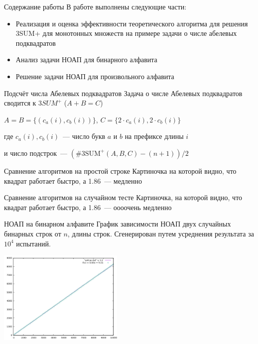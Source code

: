 \documentclass[hyperref=unicode,graphics=pdflatex,12pt]{beamer}
\begin{document}
\begin{frame}{Содержание работы}
\hspace{0.5cm}
В работе выполнены следующие части:
\begin{itemize}
\item<1-> Реализация и оценка эффективности теоретического алгоритма для решения 3SUM+
  для монотонных множеств на примере задачи о числе абелевых подквадратов
\item<2-> Анализ задачи НОАП для бинарного алфавита
\item<3-> Решение задачи НОАП для произвольного алфавита
\end{itemize}
\end{frame}

\begin{frame}{Подсчёт числа Абелевых подквадратов}
Задача о числе Абелевых подквадратов сводится к $3SUM^+$ ($A + B = C$)
\vspace{0.5cm}

 $A = B = \{(c_a(i), c_b(i))\}$, $C = \{2 \cdot c_a(i), 2 \cdot c_b(i)\}$
\vspace{0.5cm}

где $c_a(i), c_b(i)$~--- число букв $a$ и $b$ на префиксе длины $i$
\vspace{0.5cm}

 и число подстрок~--- $(\#3\text{SUM}^+(A, B, C) - (n + 1)) / 2$

\end{frame}

\begin{frame}{Сравнение алгоритмов на простой строке}
Картиночка на которой видно, что квадрат работает быстро, а 1.86~--- медленно
\end{frame}

\begin{frame}{Сравнение алгоритмов на случайном тесте}
Картиночка, на которой видно, что квадрат работает быстро, а 1.86~--- оооочень медленно
\end{frame}

\begin{frame}{НОАП на бинарном алфавите}
\hspace{0.5cm}
График зависимости НОАП двух случайных бинарных строк от $n$, длины строк. Сгенерирован путем усреднения результата за $10^4$ испытаний.
\begin{center}
\includegraphics[width=6cm]{pics/avlcas.png}
\end{center}
\end{frame}
\end{document}
